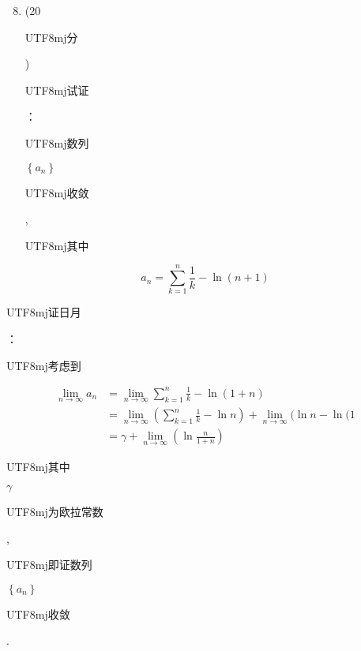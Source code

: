 \documentclass[10pt]{article}
\begin{document}
\begin{enumerate}
  \setcounter{enumi}{7}
  \item (20 \begin{CJK}{UTF8}{mj}分\end{CJK}) \begin{CJK}{UTF8}{mj}试证\end{CJK}：\begin{CJK}{UTF8}{mj}数列\end{CJK} $\left\{a_{n}\right\}$ \begin{CJK}{UTF8}{mj}收敛\end{CJK}, \begin{CJK}{UTF8}{mj}其中\end{CJK}
\end{enumerate}
$$
a_{n}=\sum_{k=1}^{n} \frac{1}{k}-\ln (n+1)
$$
\begin{CJK}{UTF8}{mj}证日月\end{CJK}：\begin{CJK}{UTF8}{mj}考虑到\end{CJK}
$$
\begin{aligned}
\lim _{n \rightarrow \infty} a_{n} &=\lim _{n \rightarrow \infty} \sum_{k=1}^{n} \frac{1}{k}-\ln (1+n) \\
&=\lim _{n \rightarrow \infty}\left(\sum_{k=1}^{n} \frac{1}{k}-\ln n\right)+\lim _{n \rightarrow \infty}(\ln n-\ln (1\\
&=\gamma+\lim _{n \rightarrow \infty}\left(\ln \frac{n}{1+n}\right)
\end{aligned}
$$
\begin{CJK}{UTF8}{mj}其中\end{CJK} $\gamma$ \begin{CJK}{UTF8}{mj}为欧拉常数\end{CJK}, \begin{CJK}{UTF8}{mj}即证数列\end{CJK} $\left\{a_{n}\right\}$ \begin{CJK}{UTF8}{mj}收敛\end{CJK}.
\end{document}
